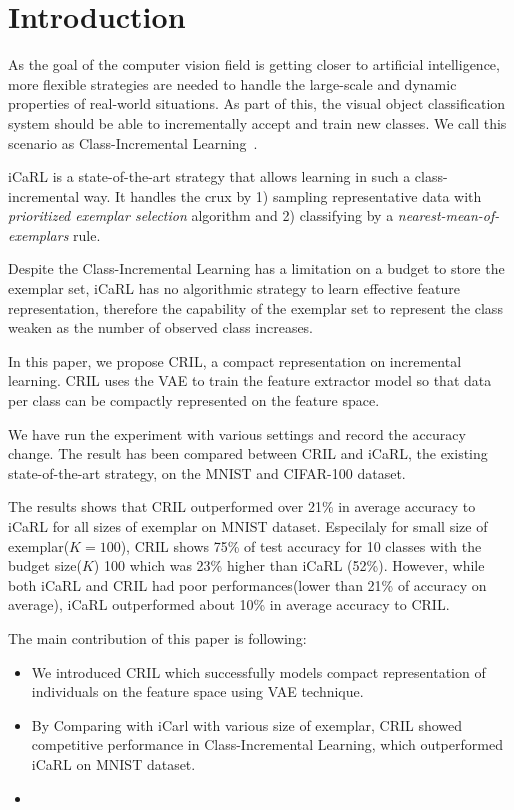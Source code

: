 \section{Introduction}
\label{sec:introduction}

As the goal of the computer vision field is getting closer to artificial intelligence, more flexible strategies are needed to handle the large-scale and dynamic properties of real-world situations. As part of this, the visual object classification system should be able to incrementally accept and train new classes. We call this scenario as Class-Incremental Learning~\cite{Rebuffi:2016aa}.

iCaRL is a state-of-the-art strategy that allows learning in such a class-incremental way. It handles the crux by 1) sampling representative data with \textit{prioritized exemplar selection} algorithm and 2) classifying by a \textit{nearest-mean-of-exemplars} rule.

Despite the Class-Incremental Learning has a limitation on a budget to store the exemplar set, iCaRL has no algorithmic strategy to learn effective feature representation, therefore the capability of the exemplar set to represent the class weaken as the number of observed class increases.

In this paper, we propose CRIL, a compact representation on incremental learning. CRIL uses the VAE to train the feature extractor model so that data per class can be compactly represented on the feature space.

We have run the experiment with various settings and record the accuracy change. The result has been compared between CRIL and iCaRL, the existing state-of-the-art strategy, on the MNIST and CIFAR-100 dataset.

The results shows that CRIL outperformed over 21\% in average accuracy to iCaRL for all sizes of exemplar on MNIST dataset. Especilaly for small size of exemplar($K=100$), CRIL shows 75\% of test accuracy for 10 classes with the budget size($K$) 100 which was 23\% higher than iCaRL (52\%). However, while both iCaRL and CRIL had poor performances(lower than 21\% of accuracy on average), iCaRL outperformed about 10\% in average accuracy to CRIL.

The main contribution of this paper is following:
\begin{itemize}
\item We introduced CRIL which successfully models compact representation of individuals on the feature space using VAE technique.
\item By Comparing with iCarl with various size of exemplar, CRIL showed competitive performance in Class-Incremental Learning, which outperformed iCaRL on MNIST dataset.
\item {}
\end{itemize}
